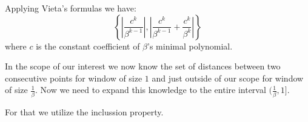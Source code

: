 \documentclass[text.tex]{subfiles}
\begin{document}
Applying Vieta's formulas we have:
$$\left\{\left|\frac{c^k}{\beta^{k-1}}\right|, \left|\frac{c^k}{\beta^{k-1}}+\frac{c^k}{\beta^{k}}\right|\right\}$$
where $c$ is the constant coefficient of $\beta$'s minimal polynomial. 

In the scope of our interest we now know the set of distances between two consecutive points for window of size $1$ and just outside of our scope for window of size $\frac{1}{\beta}$. Now we need to expand this knowledge to the entire interval $(\frac{1}{\beta},1]$. 

For that we utilize the inclussion property. 
\end{document}
